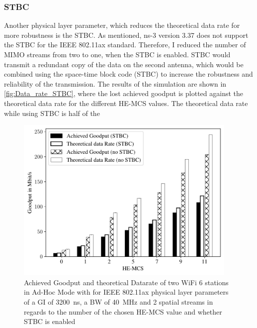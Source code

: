 \subsubsection*{\acf{STBC}}
Another physical layer parameter, which reduces the theoretical data rate for more robustness is the \ac{STBC}.
As mentioned, ns-3 version 3.37 does not support the \ac{STBC} for the IEEE 802.11ax standard. Therefore, I reduced the number of
\ac{MIMO} streams from two to one, when the \ac{STBC} is enabled. \ac{STBC} would transmit a redundant copy of the data on the second antenna, which would be combined
using the space-time block code (STBC) to increase the robustness and reliability of the transmission.
The results of the simulation are shown in \autoref{fig:Data_rate_STBC}, where the lost achieved goodput is plotted against
the theoretical data rate for the different HE-\ac{MCS} values. The theoretical data rate while using \ac{STBC} is half of the
\begin{figure}[H]%
	\centering
	\includegraphics[width=0.95\textwidth]{figures/STBC_dataRate_simulation}
	\caption{Achieved Goodput and theoretical Datarate of two WiFi 6 stations in Ad-Hoc Mode with for IEEE 802.11ax physical layer parameters of a \acf{GI} of \SI{3200}{\nano\second}, a \acf{BW} of \SI{40}{\mega\hertz} and 2 spatial streams  in regards to the number of the chosen HE-\acf{MCS} value and whether \acf{STBC} is enabled}%
	\label{fig:Data_rate_STBC}%
\end{figure}


